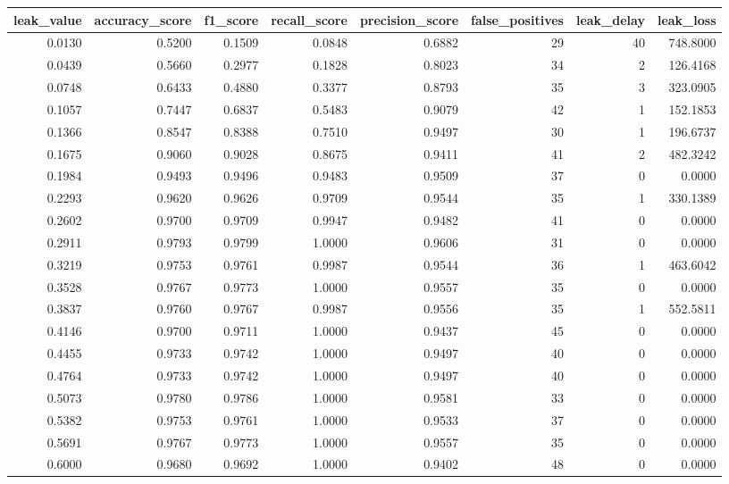 \begin{tabular}{rrrrrrrr}
\toprule
leak\_value & accuracy\_score & f1\_score & recall\_score & precision\_score & false\_positives & leak\_delay & leak\_loss \\
\midrule
0.0130 & 0.5200 & 0.1509 & 0.0848 & 0.6882 & 29 & 40 & 748.8000 \\
0.0439 & 0.5660 & 0.2977 & 0.1828 & 0.8023 & 34 & 2 & 126.4168 \\
0.0748 & 0.6433 & 0.4880 & 0.3377 & 0.8793 & 35 & 3 & 323.0905 \\
0.1057 & 0.7447 & 0.6837 & 0.5483 & 0.9079 & 42 & 1 & 152.1853 \\
0.1366 & 0.8547 & 0.8388 & 0.7510 & 0.9497 & 30 & 1 & 196.6737 \\
0.1675 & 0.9060 & 0.9028 & 0.8675 & 0.9411 & 41 & 2 & 482.3242 \\
0.1984 & 0.9493 & 0.9496 & 0.9483 & 0.9509 & 37 & 0 & 0.0000 \\
0.2293 & 0.9620 & 0.9626 & 0.9709 & 0.9544 & 35 & 1 & 330.1389 \\
0.2602 & 0.9700 & 0.9709 & 0.9947 & 0.9482 & 41 & 0 & 0.0000 \\
0.2911 & 0.9793 & 0.9799 & 1.0000 & 0.9606 & 31 & 0 & 0.0000 \\
0.3219 & 0.9753 & 0.9761 & 0.9987 & 0.9544 & 36 & 1 & 463.6042 \\
0.3528 & 0.9767 & 0.9773 & 1.0000 & 0.9557 & 35 & 0 & 0.0000 \\
0.3837 & 0.9760 & 0.9767 & 0.9987 & 0.9556 & 35 & 1 & 552.5811 \\
0.4146 & 0.9700 & 0.9711 & 1.0000 & 0.9437 & 45 & 0 & 0.0000 \\
0.4455 & 0.9733 & 0.9742 & 1.0000 & 0.9497 & 40 & 0 & 0.0000 \\
0.4764 & 0.9733 & 0.9742 & 1.0000 & 0.9497 & 40 & 0 & 0.0000 \\
0.5073 & 0.9780 & 0.9786 & 1.0000 & 0.9581 & 33 & 0 & 0.0000 \\
0.5382 & 0.9753 & 0.9761 & 1.0000 & 0.9533 & 37 & 0 & 0.0000 \\
0.5691 & 0.9767 & 0.9773 & 1.0000 & 0.9557 & 35 & 0 & 0.0000 \\
0.6000 & 0.9680 & 0.9692 & 1.0000 & 0.9402 & 48 & 0 & 0.0000 \\
\bottomrule
\end{tabular}
